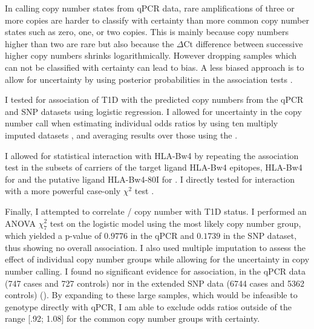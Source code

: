 In calling copy number states from qPCR data, rare amplifications of three or more copies are harder to classify with certainty than more common copy number states such as zero, one, or two copies.
This is mainly because copy numbers higher than two are rare but also because the $\Delta$Ct difference between successive higher copy numbers shrinks logarithmically.
However dropping samples which can not be classified with certainty can lead to bias.
A less biased approach is to allow for uncertainty by using posterior probabilities in the association tests \citep{Plagnol:2007dw}.  


I tested for association of T1D with the predicted copy numbers from the qPCR and SNP datasets using logistic regression.
I allowed for uncertainty in the copy number call when estimating individual odds ratios by using ten multiply imputed datasets \citep{Cordell:2006da},
and averaging results over those using the .

I allowed for statistical interaction with HLA-Bw4 by repeating the association test in the subsets of carriers of the target ligand HLA-Bw4 epitopes, HLA-Bw4 for  and the putative ligand HLA-Bw4-80I for .
I directly tested for interaction with a more powerful case-only $\chi^2$ test \citep{Yang:1999wk,Cordell:2009jb}.


Finally, I attempted to correlate / copy number with T1D status.
I performed an \Gls{ANOVA} $\chi^{2}_{7}$ test on the logistic model using the most likely copy number group, which yielded a p-value of $0.9776$ in the qPCR and $0.1739$ in the SNP dataset, thus showing no overall association.
I also used multiple imputation to assess the effect of individual copy number groups while allowing for the uncertainty in copy number calling.
I found no significant evidence for association, in the qPCR data (747 cases and 727 controls) nor in the extended SNP data (6744 cases and 5362 controls) ().
By expanding to these large samples, which would be infeasible to genotype directly with qPCR, I am able to exclude odds ratios outside of the range [.92; 1.08] for the common copy number groups with  certainty.

